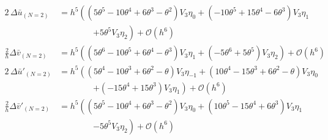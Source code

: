 \begin{align*}
  2\,\Delta \bar{u}_{(N=2)}          & = h^{5}\left(\left(5 \theta^{5} - 10 \theta^{4} + 6 \theta^{3} - \theta^{2}\right) V_{3} \eta_{0} + \left(-10 \theta^{5} + 15 \theta^{4} - 6 \theta^{3}\right) V_{3} \eta_{1} \right.      \\
                                     & \qquad\qquad \left.+5 \theta^{5} V_{3} \eta_{2}\right) + \mathcal{O}(h^{6})                                                                                                                \\
  \frac{2}{h}\Delta \bar{v}_{(N=2)}  & = h^{5}\left(\left(5 \theta^{6} - 10 \theta^{5} + 6 \theta^{4} - \theta^{3}\right) V_{3} \eta_{1} + \left(-5 \theta^{6} + 5 \theta^{5}\right) V_{3} \eta_{2}\right) + \mathcal{O}(h^{6})   \\
  2\,\Delta \bar{u}'_{(N=2)}         & = h^{5}\left(\left(5 \theta^{4} - 10 \theta^{3} + 6 \theta^{2} - \theta\right) V_{3} \eta_{-1} + \left(10 \theta^{4} - 15 \theta^{3} + 6 \theta^{2} - \theta\right) V_{3} \eta_{0} \right. \\
                                     & \qquad\qquad \left. + \left(-15 \theta^{4} + 15 \theta^{3}\right) V_{3} \eta_{1}\right) + \mathcal{O}(h^{6})                                                                               \\
  \frac{2}{h}\Delta \bar{v}'_{(N=2)} & = h^{5}\left(\left(5 \theta^{5} - 10 \theta^{4} + 6 \theta^{3} - \theta^{2}\right) V_{3} \eta_{0} + \left(10 \theta^{5} - 15 \theta^{4} + 6 \theta^{3}\right) V_{3} \eta_{1} \right.       \\
                                     & \qquad\qquad \left. -5 \theta^{5} V_{3} \eta_{2}\right) + \mathcal{O}(h^{6})
\end{align*}

%


